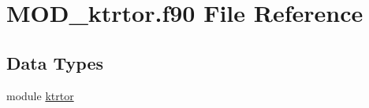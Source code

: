 \hypertarget{MOD__ktrtor_8f90}{\section{M\-O\-D\-\_\-ktrtor.\-f90 File Reference}
\label{MOD__ktrtor_8f90}
}
\subsection*{Data Types}
\begin{DoxyCompactItemize}
\item 
module \hyperlink{classktrtor}{ktrtor}
\end{DoxyCompactItemize}
